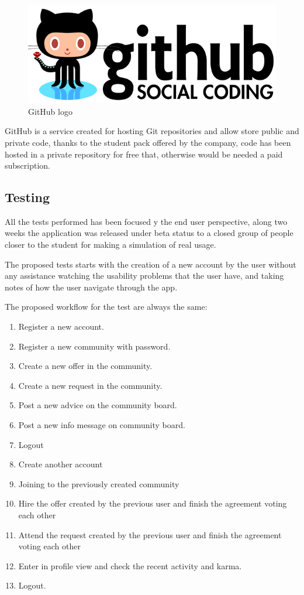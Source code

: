 \documentclass{DeustoFDP}
\begin{document}
\begin{figure}[h]
\centering
\includegraphics[width=0.7\linewidth]{fig/github-logo}
\caption[GitHub logo]{GitHub logo}
\label{fig:github-logo}
\end{figure}

GitHub \cite{Github} is a service created for hosting Git repositories and allow store public and private code, thanks to the student pack offered by the company, code has been hosted in a private repository for free that, otherwise would be needed a paid subscription.
\newpage
\subsection{Testing}
All the tests performed has been focused y the end user perspective, along two weeks the application was released under beta status to a closed group of people closer to the student for making a simulation of real usage.

The proposed tests starts with the creation of a new account by the user without any assistance watching the usability problems that the user have, and taking notes of how the user navigate through the app.

The proposed workflow for the test are always the same:

\begin{enumerate}
	\item Register a new account.
	\item Register a new community with password.
	\item Create a new offer in the community.
	\item Create a new request in the community.
	\item Post a new advice on the community board.
	\item Post a new info message on community board.
	\item Logout
	\item Create another account
	\item Joining to the previously created community
	\item Hire the offer created by the previous user and finish the agreement voting each other
	\item Attend the request created by the previous user and finish the agreement voting each other
	\item Enter in profile view and check the recent activity and karma.
	\item Logout.
\end{enumerate}
\end{document}
